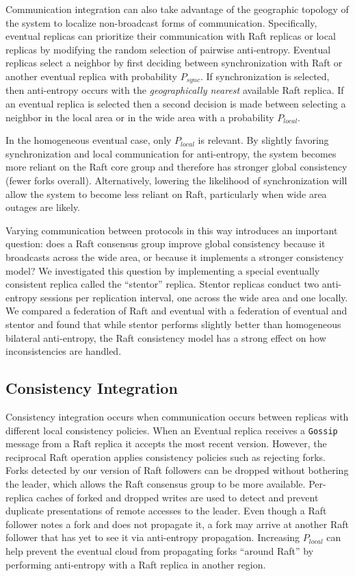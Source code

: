 \documentclass[10pt,conference,letterpaper]{IEEEtran}
\begin{document}
Communication integration can also take advantage of the geographic topology of the
system to localize non-broadcast forms of communication.
Specifically, eventual replicas can prioritize their communication with Raft replicas or
local replicas by modifying the random selection of pairwise anti-entropy.
Eventual replicas select a neighbor by first deciding between synchronization with Raft
or another eventual replica with probability $P_{sync}$.
If synchronization is selected, then anti-entropy occurs with the \textit{geographically
nearest} available Raft replica.
If an eventual replica is selected then a second decision is made between selecting a
neighbor in the local area or in the wide area with a probability $P_{local}$.

In the homogeneous eventual case, only $P_{local}$ is relevant.
By slightly favoring synchronization and local communication for anti-entropy, the
system becomes more reliant on the Raft core group and therefore has stronger global
consistency (fewer forks overall).
Alternatively, lowering the likelihood of synchronization will allow the system to become
less reliant on Raft, particularly when wide area outages are likely.

Varying communication between protocols in this way introduces an important
question: does a Raft consensus group improve global consistency because
it broadcasts across the wide area, or because it implements a stronger
consistency model?
We investigated this question by implementing
a special eventually consistent replica called the ``stentor'' replica.
Stentor replicas conduct two anti-entropy sessions per replication interval,
one across the wide area and one locally.
We compared a federation of Raft and eventual with a federation of eventual
and stentor and found that while stentor performs slightly better than
homogeneous bilateral anti-entropy, the Raft consistency model has a strong
effect on how inconsistencies are handled.

\subsection{Consistency Integration}

Consistency integration occurs when communication occurs between replicas with
different local consistency policies.
When an Eventual replica receives a \texttt{Gossip} message from a Raft
replica it accepts the most recent version.
However, the reciprocal Raft operation applies consistency policies such as
rejecting forks.
Forks detected by our version of Raft followers can be dropped without
bothering the leader, which allows the Raft consensus group to be more
available.
Per-replica caches of forked and dropped writes are used to detect and prevent
duplicate presentations of remote accesses to the leader.
Even though a Raft follower notes a fork and does not propagate it, a fork may
arrive at another Raft follower that has yet to see it via anti-entropy
propagation.
Increasing $P_{local}$ can help prevent the eventual cloud from propagating
forks ``around Raft'' by performing anti-entropy with a Raft replica in
another region.
\end{document}
